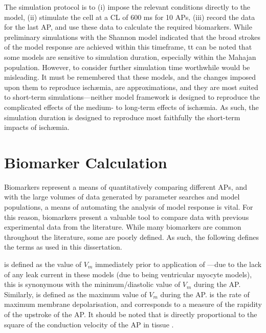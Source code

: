 \documentclass[../thesis-main.tex]{subfiles}
\begin{document}
The simulation protocol is to (i) impose the relevant conditions directly to the model, (ii) stimulate the cell at a CL of 600 ms for 10 APs, (iii) record the data for the last AP, and use these data to calculate the required biomarkers. While preliminary simulations with the Shannon model indicated that the broad strokes of the model response are achieved within this timeframe, tt can be noted that some models are sensitive to simulation duration, especially within the Mahajan population. However, to consider further simulation time worthwhile would be misleading. It must be remembered that these models, and the changes imposed upon them to reproduce isch\ae{}mia, are approximations, and they are most suited to short-term simulations---neither model framework is designed to reproduce the complicated effects of the medium- to long-term effects of isch\ae{}mia. As such, the simulation duration is designed to reproduce most faithfully the short-term impacts of isch\ae{}mia.


\section{Biomarker Calculation}
\label{sec:biomarkers}

Biomarkers represent a means of quantitatively comparing different APs, and with the large volumes of data generated by parameter searches and model populations, a means of automating the analysis of model response is vital. For this reason, biomarkers present a valuable tool to compare data with previous experimental data from the literature. While many biomarkers are common throughout the literature, some are poorly defined. As such, the following defines the terms as used in this dissertation.

\vrest{} is defined as the value of $V_m$ immediately prior to application of \istim{}---due to the lack of any leak current in these models (due to being ventricular myocyte models), this is synonymous with the minimum/diastolic value of $V_m$ during the AP. Similarly, \vmax{} is defined as the maximum value of $V_m$ during the AP. \dvdt{} is the rate of maximum membrane depolarisation, and corresponds to a measure of the rapidity of the upstroke of the AP. It should be noted that \dvdt{} is directly proportional to the square of the conduction velocity of the AP in tissue \citep{Hodgkin1954, Kleber2004, Walton1983, Tasaki1957}.
\end{document}
